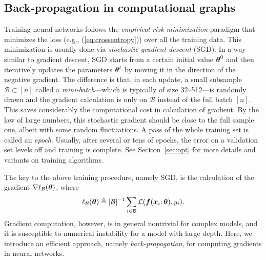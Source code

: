 \subsection{Back-propagation in computational graphs}

Training neural networks follows the \emph{empirical risk minimization} paradigm that minimizes the loss (e.g., (\ref{eq:crossentropy})) over all the training data. This minimization is usually done via \textit{stochastic gradient descent} (SGD). In a way similar to gradient descent, SGD starts from a certain initial value $\text{\boldmath $\theta$}^{0}$ and then iteratively updates the parameters $\text{\boldmath $\theta$}^{t}$ by moving it in the direction of the negative gradient.
The difference is that, in each update, a small subsample $\mathcal{B} \subset [n]$ called a \textit{mini-batch}---which is typically of size 32--512---is randomly drawn and the gradient calculation is only on $\mathcal{B}$ instead of the full batch $[n]$.  This saves considerably the computational cost in calculation of gradient.  By the law of large numbers, this stochastic gradient should be close to the full sample one, albeit with some random fluctuations.  A pass of the whole training set is called an \textit{epoch}. Usually, after several or tens of epochs, the error on a validation set levels off and training is complete. See Section~\ref{sec:opt} for more details and variants on training algorithms.

The key to the above training procedure, namely SGD, is the calculation of the gradient $\nabla \ell_{\mathcal{B}}(\text{\boldmath $\theta$})$, where
\begin{equation}\label{eq:loss-nn}
\ell_{\mathcal{B}}(\text{\boldmath $\theta$}) \triangleq |\mathcal{B}|^{-1} \sum_{i \in \mathcal{B}} \mathcal{L}(\text{\boldmath $f$}(\text{\boldmath $x$}_i ; \text{\boldmath $\theta$}), y_i).
\end{equation}
Gradient computation, however, is in general nontrivial for complex models, and it is susceptible to numerical instability for a model with large depth. Here, we introduce an efficient approach, namely \textit{back-propagation}, for computing gradients in neural networks.

